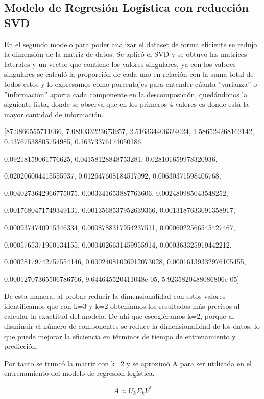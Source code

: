 \documentclass[a4paper,10pt,twocolumn]{article}
\begin{document}
\subsection{Modelo de Regresión Logística con reducción SVD}
En el segundo modelo para poder analizar el dataset de forma eficiente se redujo la dimensión de la matriz de datos. Se aplicó el SVD y se obtuvo las matrices laterales y un vector que contiene los valores singulares, ya con los valores singulares se calculó la proporción de cada uno en relación con la suma total de todos estos y lo expresamos como porcentajes para entender cúanta ”varianza” o ”información” aporta cada componente en la descomposición, quedándonos la siguiente lista, donde se observa que en los primeros 4 valores es donde está la mayor cantidad de información.

[87.9866555711066, 7.089033223673957,             2.516334406324024,
1.586524268162142, 0.43767538805754985, 0.16373376174050186,

0.09218159061776625, 0.04158128848753281, 0.028101659978320936,

0.020206004415555937, 0.012647608184517092, 0.00630371598406768,

0.0040273642966775075, 0.003341653887763606, 0.002480985043548252,

0.0017680471749349131, 0.0013568537952639366, 0.0013187633091358917,

0.0009374740915346334, 0.0008788317954237511, 0.0006022566545427467,

0.0005765371960134155, 0.0004026631459955914, 0.000363325919442212,

0.00028179742757554146, 0.00024081026912073028, 0.00016139332976105455,

0.00012707365506786766, 9.644645520411048e-05, 5.9235820488086806e-05]


De esta manera, al probar reducir la dimensionalidad con estos valores identificamos que con k=3 y k=2 obteníamos los resultados más precisos al calcular la exactitud del modelo. De ahí que escogiéramos k=2, porque al disminuir el número de componentes se reduce la dimensionalidad de los datos, lo que puede mejorar la eficiencia en términos de tiempo de entrenamiento y predicción.

Por tanto se truncó la matriz con k=2 y se aproximó A para ser utilizada en el entrenamiento del modelo de regresión logística.

\[
A \approx U_k \Sigma_k V^*
\]
\end{document}
